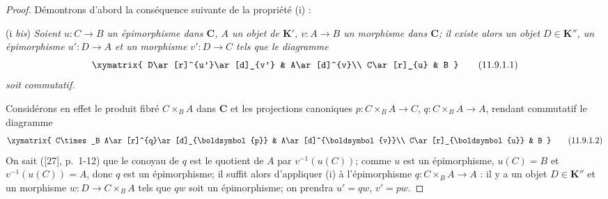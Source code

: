 \begin{proof}
Démontrons d'abord la conséquence suivante de la propriété (i) :

(i \emph{bis}) \emph{Soient $u:C\to B$ un épimorphisme dans $\boldsymbol{C}$, $A$ un
objet de $\boldsymbol{K}'$, $v:A\to B$ un morphisme dans $\boldsymbol{C}$; il existe alors un
objet $D\in\boldsymbol{K}''$, un épimorphisme $u':D\to A$ et un morphisme $v':D\to C$
tels que le diagramme}
\[
\xymatrix{
D\ar[r]^{u'}\ar[d]_{v'} & A\ar[d]^{v}\\
C\ar[r]_{u} & B
}
\tag{11.9.1.1}\label{0.11.9.1.1-fr}
\]
\emph{soit commutatif.}

Considérons en effet le produit fibré $C\times_B A$ dans $\boldsymbol{C}$ et les
projections canoniques $p:C\times_B A\to C$, $q:C\times_B A\to A$, rendant
commutatif le diagramme
\[
\xymatrix{
C\times_B A\ar[r]^{q}\ar[d]_{\boldsymbol{p}} & A\ar[d]^{\boldsymbol{v}}\\
C\ar[r]_{\boldsymbol{u}} & B
}
\tag{11.9.1.2}\label{0.11.9.1.2-fr}
\]
On sait ([27], p.~1-12) que le conoyau de $q$ est le quotient de $A$ par
$v^{-1}(u(C))$; comme $u$ est un épimorphisme, $u(C)=B$ et
$v^{-1}(u(C))=A$, donc $q$ est un épimorphisme; il suffit alors d'appliquer
(i) à l'épimorphisme $q:C\times_B A\to A$ : il y a un objet $D\in\boldsymbol{K}''$ et un
morphisme $w:D\to C\times_B A$ tels que $qw$ soit un épimorphisme; on
prendra $u'=qw$, $v'=pw$.


\end{proof}
